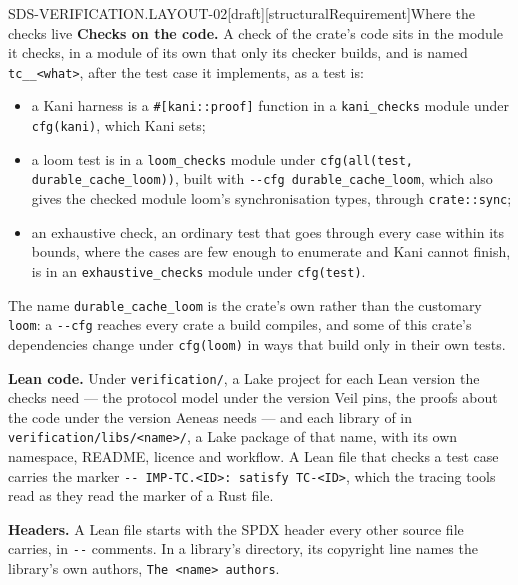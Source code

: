 \begin{requirement}{SDS-VERIFICATION.LAYOUT-02}[draft][structuralRequirement]{Where the checks live}
  \textbf{Checks on the code.} A check of the crate's code sits in the
  module it checks, in a module of its own that only its checker builds, and
  is named \texttt{tc\_<test case>\_<what>}, after the test case it
  implements, as a test is:
  \begin{itemize}
    \item a Kani harness is a \texttt{\#[kani::proof]} function in a
      \texttt{kani\_checks} module under \texttt{cfg(kani)}, which Kani sets;
    \item a loom test is in a \texttt{loom\_checks} module under
      \texttt{cfg(all(test, durable\_cache\_loom))}, built with
      \texttt{-{}-cfg durable\_cache\_loom}, which also gives the checked
      module loom's synchronisation types, through \texttt{crate::sync};
    \item an exhaustive check, an ordinary test that goes through every case
      within its bounds, where the cases are few enough to enumerate and Kani
      cannot finish, is in an \texttt{exhaustive\_checks} module under
      \texttt{cfg(test)}.
  \end{itemize}
  The name \texttt{durable\_cache\_loom} is the crate's own rather than the
  customary \texttt{loom}: a \texttt{-{}-cfg} reaches every crate a build
  compiles, and some of this crate's dependencies change under
  \texttt{cfg(loom)} in ways that build only in their own tests.

  \textbf{Lean code.} Under \texttt{verification/}, a Lake project for each
  Lean version the checks need --- the protocol model under the version Veil
  pins, the proofs about the code under the version Aeneas needs --- and
  each library of  in
  \texttt{verification/libs/<name>/}, a Lake package of that name, with its
  own namespace, README, licence and workflow. A Lean file that checks a
  test case carries the marker \texttt{-{}- IMP-TC.<ID>: satisfy TC-<ID>},
  which the tracing tools read as they read the marker of a Rust file.

  \textbf{Headers.} A Lean file starts with the SPDX header every other
  source file carries, in \texttt{-{}-} comments. In a library's directory,
  its copyright line names the library's own authors, \texttt{The <name>
  authors}.



\end{requirement}

